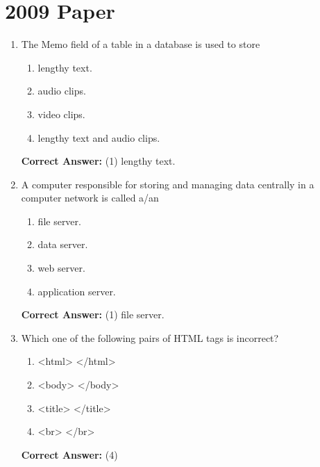 \documentclass[12pt]{article}
\begin{document}
\section*{2009 Paper}
\begin{enumerate}[label=Q\arabic*:,leftmargin=*,resume]
\item The Memo field of a table in a database is used to store\\
\begin{enumerate}[label=(\arabic*)]
\item lengthy text.
\item audio clips.
\item video clips.
\item lengthy text and audio clips.
\end{enumerate}
\textbf{Correct Answer:} (1) lengthy text.

\item A computer responsible for storing and managing data centrally in a computer network is called a/an\\
\begin{enumerate}[label=(\arabic*)]
\item file server.
\item data server.
\item web server.
\item application server.
\end{enumerate}
\textbf{Correct Answer:} (1) file server.

\item Which one of the following pairs of HTML tags is incorrect?\\
\begin{enumerate}[label=(\arabic*)]
\item <html> </html>
\item <body> </body>
\item <title> </title>
\item <br> </br>
\end{enumerate}
\textbf{Correct Answer:} (4)
\end{enumerate}

\end{document}
